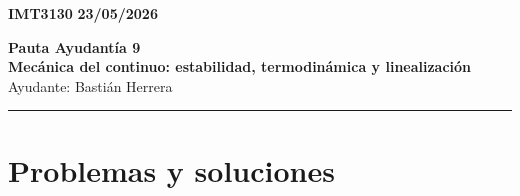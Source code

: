 \documentclass[11pt]{article}
\begin{document}
    \begin{flushleft}
        \small
        \vspace{1pt}
        \textbf{IMT3130} \hfill
        \textbf{23/05/2026}
    \end{flushleft}
    \begin{center}
        \LARGE\textbf{Pauta Ayudantía 9}\\
        \vspace{3pt}
        \normalsize\textbf{Mecánica del continuo: estabilidad, termodinámica y linealización}\\
        \normalsize Ayudante: Bastián Herrera 
        \rule{\textwidth}{0.05mm}
    \end{center}

\section*{Problemas y soluciones}
\end{document}
